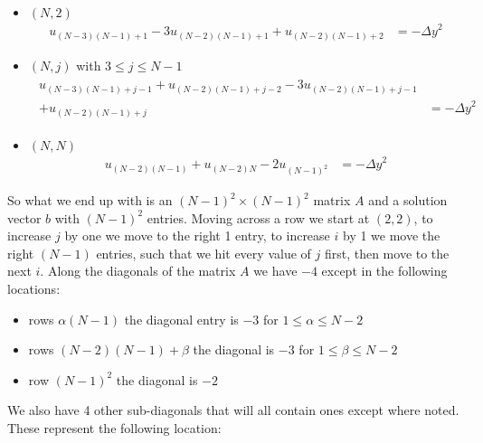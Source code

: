 \documentclass[10pt]{article}
\begin{document}
\begin{itemize}
\begin{align*}
\begin{split}
			\end{split}
		\end{align*}
		\item $ (N,2) $
		\begin{align*}
			u_{(N-3)(N-1)+1} - 3u_{(N-2)(N-1)+1} + u_{(N-2)(N-1)+2} &= -{\Delta y}^2
		\end{align*}
		\item $ (N,j) $ with $ 3\leq j\leq N-1 $
		\begin{align*}
			\begin{split}
				u_{(N-3)(N-1)+j-1} + u_{(N-2)(N-1)+j-2} - 3u_{(N-2)(N-1)+j-1}\\ + u_{(N-2)(N-1)+j} &= -{\Delta y}^2
			\end{split}
		\end{align*}
		\item $ (N,N) $
		\begin{align*}
			u_{(N-2)(N-1)} + u_{(N-2)N} - 2u_{(N-1)^2} &= -{\Delta y}^2
		\end{align*}
	\end{itemize}
	So what we end up with is an $ (N-1)^2\times(N-1)^2 $ matrix $ A $ and a solution vector $ b $ with $ (N-1)^2 $ entries. Moving across a row we start at $ (2,2) $, to increase $ j $ by one we move to the right 1 entry, to increase $ i $ by 1 we move the right $ (N-1) $ entries, such that we hit every value of $ j $ first, then move to the next $ i $.
	\newline\indent Along the diagonals of the matrix $ A $ we have $ -4 $ except in the following locations:
	\begin{itemize}
		\item rows $ \alpha(N-1) $ the diagonal entry is $ -3 $ for $ 1\leq \alpha\leq N-2 $
		\item rows $ \left(N-2\right)\left(N-1\right)+\beta $ the diagonal is $ -3 $ for $ 1\leq\beta\leq N-2 $
		\item row $ \left(N-1\right)^2 $ the diagonal is $ -2 $
	\end{itemize}
	We also have 4 other sub-diagonals that will all contain ones except where noted. These represent the following location:
\end{document}
